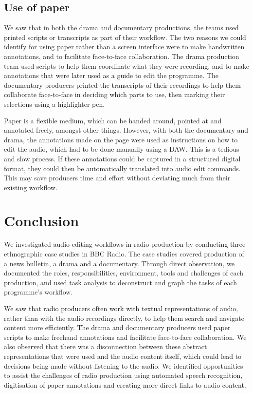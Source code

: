 \subsection{Use of paper}
We saw that in both the drama and documentary productions, the teams used printed scripts or transcripts as part of
their workflow. The two reasons we could identify for using paper rather than a screen interface were to make
handwritten annotations, and to facilitate face-to-face collaboration.  The drama production team used scripts to help
them coordinate what they were recording, and to make annotations that were later used as a guide to edit the
programme. The documentary producers printed the transcripts of their recordings to help them collaborate face-to-face
in deciding which parts to use, then marking their selections using a highlighter pen.

Paper is a flexible medium, which can be handed around, pointed at and annotated freely, amongst other things.
However, with both the documentary and drama, the annotations made on the page were used as instructions on how to edit
the audio, which had to be done manually using a DAW. This is a tedious and slow process. If these annotations could be
captured in a structured digital format, they could then be automatically translated into audio edit commands. This may
save producers time and effort without deviating much from their existing workflow.

\section{Conclusion}\label{sec:ethno-conclusion}
We investigated audio editing workflows in radio production by conducting three ethnographic case studies in BBC
Radio. The case studies covered production of a news bulletin, a drama and a documentary.  Through direct observation,
we documented the roles, responsibilities, environment, tools and challenges of each production, and used task analysis
to deconstruct and graph the tasks of each programme's workflow.

We saw that radio producers often work with textual representations of audio, rather than with the audio recordings
directly, to help them search and navigate content more efficiently.  The drama and documentary producers used paper
scripts to make freehand annotations and facilitate face-to-face collaboration. We also observed that there was a
disconnection between these abstract representations that were used and the audio content itself, which could lead to
decisions being made without listening to the audio.  We identified opportunities to assist the challenges of radio
production using automated speech recognition, digitisation of paper annotations and creating more direct links to
audio content.

